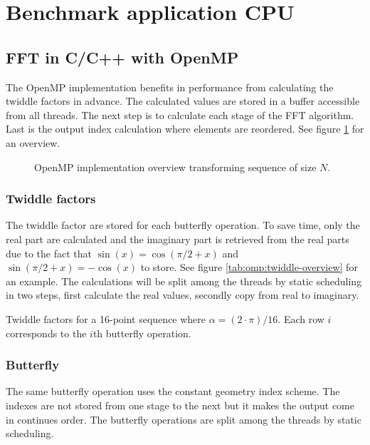 \section{Benchmark application CPU}

\subsection{FFT in C/C++ with OpenMP}

The OpenMP implementation benefits in performance from calculating the twiddle factors in advance. The calculated values are stored in a buffer accessible from all threads. The next step is to calculate each stage of the FFT algorithm. Last is the output index calculation where elements are reordered. See figure \ref{fig:omp:overview} for an overview.

\begin{figure}
	\centering
	
	\caption{OpenMP implementation overview transforming sequence of size $N$.}
	\label{fig:omp:overview}
\end{figure}

\subsubsection{Twiddle factors}

The twiddle factor are stored for each butterfly operation. To save time, only the real part are calculated and the imaginary part is retrieved from the real parts due to the fact that $\sin(x) = \cos(\pi/2 + x)$ and $\sin(\pi/2 + x) = -\cos(x)$ to store. See figure \ref{tab:omp:twiddle-overview} for an example. The calculations will be split among the threads by static scheduling in two steps, first calculate the real values, secondly copy from real to imaginary.

\begin{table}[h!]
	\centering
	
	\caption{Twiddle factors for a 16-point sequence where $\alpha = (2 \cdot \pi) / 16$. Each row $i$ corresponds to the $i$th butterfly operation.}
	\label{tab:omp:twiddle-overview}
\end{table}

\subsubsection{Butterfly}

The same butterfly operation uses the constant geometry index scheme. The indexes are not stored from one stage to the next but it makes the output come in continues order. The butterfly operations are split among the threads by static scheduling.

